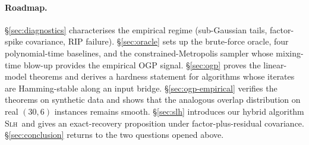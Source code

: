 \documentclass[11pt]{article}
\begin{document}
\paragraph{Roadmap.}\S\ref{sec:diagnostics} characterises the empirical regime
(sub-Gaussian tails, factor-spike covariance, RIP failure). \S\ref{sec:oracle} sets up
the brute-force oracle, four polynomial-time baselines, and the constrained-Metropolis
sampler whose mixing-time blow-up provides the empirical OGP signal.
\S\ref{sec:ogp} proves the linear-model theorems and derives a hardness statement for
algorithms whose iterates are Hamming-stable along an input bridge.
\S\ref{sec:ogp-empirical} verifies the theorems on synthetic data and shows that the
analogous overlap distribution on real $(30,6)$ instances remains smooth.
\S\ref{sec:slh} introduces our hybrid algorithm \textsc{Slh}\ and gives an
exact-recovery proposition under factor-plus-residual covariance.
\S\ref{sec:conclusion} returns to the two questions opened above.












\end{document}
